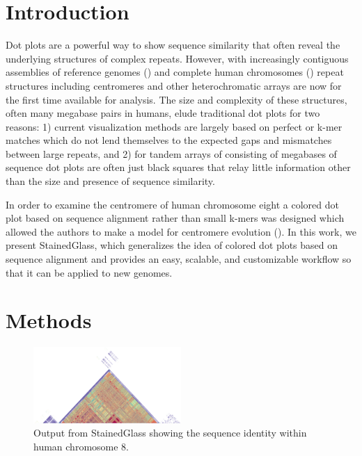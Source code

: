 \documentclass[nocrop, noinfo]{bioinfo}
\begin{document}
\section{Introduction}
Dot plots are a powerful way to show sequence similarity that often reveal the
underlying structures of complex repeats. However, with increasingly contiguous
assemblies of reference genomes (\citealp{Rhie2021-zg}) and complete human
chromosomes (\citealp{Miga2020-pj,Logsdon2021-zr,Nurk2021-wb}) repeat structures
including centromeres and other heterochromatic arrays are now for the first
time available for analysis. The size and complexity of these structures, often
many megabase pairs in humans, elude traditional dot plots for two reasons: 1)
current visualization methods are largely based on perfect or k-mer matches
which do not lend themselves to the expected gaps and mismatches between large
repeats, and 2) for tandem arrays of consisting of megabases of sequence dot
plots are often just black squares that relay little information other than the
size and presence of sequence similarity. 

In order to examine the centromere of human chromosome eight a colored dot plot
based on sequence alignment rather than small k-mers was designed which allowed
the authors to make a model for centromere evolution (\citealp{Logsdon2021-zr}).
In this work, we present StainedGlass, which generalizes the idea of colored dot
plots based on sequence alignment and provides an easy, scalable, and
customizable workflow so that it can be applied to new genomes. 

\section{Methods} 
\begin{figure}[!tpb]%
\centerline{
	\includegraphics[width=0.5\textwidth,keepaspectratio]{figure1.png}
}
\caption{Output from StainedGlass showing the sequence identity within human
chromosome 8.}
\label{fig:01} 
\end{figure}
\end{document}
